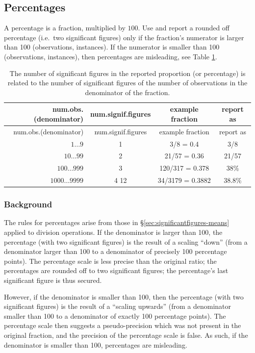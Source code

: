 \documentclass[
]{book}
\begin{document}
\hypertarget{percentages}{%
\subsection{Percentages}\label{percentages}}

A percentage is a fraction, multiplied by \(100\).
Use and report a rounded off percentage (i.e.~two significant
figures) only if the fraction's numerator is larger
than 100 (observations, instances). If the numerator is smaller than 100
(observations, instances), then percentages are misleading,
see Table \ref{tab:signiffigurepercentage}.

\begin{longtable}[]{@{}rccc@{}}
\caption{\label{tab:signiffigurepercentage} The number of significant figures in the reported
proportion (or percentage) is related to the number of significant figures of the number
of observations in the denominator of the fraction.}\tabularnewline
\toprule
num.obs.(denominator) & num.signif.figures & example fraction & report as\tabularnewline
\midrule
\endfirsthead
\toprule
num.obs.(denominator) & num.signif.figures & example fraction & report as\tabularnewline
\midrule
\endhead
\(1\dots9\) & 1 & 3/8 = 0.4 & 3/8\tabularnewline
\(10\dots99\) & 2 & 21/57 = 0.36 & 21/57\tabularnewline
\(100\dots999\) & 3 & 120/317 = 0.378 & 38\%\tabularnewline
\(1000\dots9999\) & 4 12 & 34/3179 = 0.3882 & 38.8\%\tabularnewline
\bottomrule
\end{longtable}

\hypertarget{background-1}{%
\subsubsection{Background}\label{background-1}}

The rules for percentages arise from those in
§\ref{sec:significantfigures-means} applied to division operations.
If the denominator is larger than 100, the percentage (with two significant
figures) is the result of a scaling ``down'' (from a denominator
larger than 100 to a denominator of precisely 100 percentage points).
The percentage scale is less precise than the original
ratio; the percentages are rounded off to two significant figures;
the percentage's last significant figure is thus secured.

However, if the denominator is smaller than 100, then the percentage (with
two significant figures) is the result of a ``scaling upwards'' (from a denominator
smaller than 100 to a denominator of exactly 100 percentage points). The percentage
scale then suggests a
pseudo-precision which was not present in the original fraction,
and the precision of the percentage scale is false. As such, if the denominator is
smaller than 100, percentages are misleading.
\end{document}
